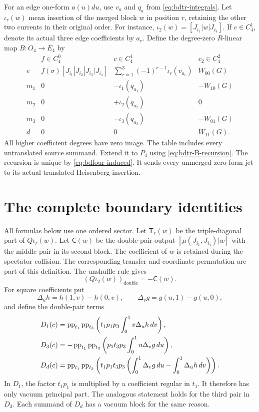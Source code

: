 For an edge one-form $a(u)du$, use $v_a$ and $q_a$ from \eqref{eq:bdtr-integrals}.
Let $\iota_r(w)$ mean insertion of the merged block $w$ in position $r$, retaining the other two currents in their original order.
For instance, $\iota_2(w)=[J_{i_1}|w|J_{i_4}]$.
If $c\in C_4^1$, denote its actual three edge coefficients by $a_r$.
Define the degree-zero $R$-linear map $B:O_4\to E_4$ by
\begin{equation}\label{eq:bdfour-B}
 \begin{array}{c|ccc}
 &f\in C_4^0&c\in C_4^1&c_2\in C_4^2\\ \hline
 e&f(\sigma)[J_{i_1}|J_{i_2}|J_{i_3}|J_{i_4}]
       &\sum_{r=1}^3(-1)^{r-1}\iota_r(v_{a_r})&W_{00}(G)\\
 m_1&0&-\iota_1(q_{a_1})&-W_{10}(G)\\
 m_2&0&+\iota_2(q_{a_2})&0\\
 m_3&0&-\iota_3(q_{a_3})&-W_{01}(G)\\
 d&0&0&W_{11}(G).
 \end{array}
\end{equation}
All higher coefficient degrees have zero image.
The table includes every untranslated source summand.
Extend it to $P_4$ using \eqref{eq:bdtr-B-recursion}.
The recursion is unique by \eqref{eq:bdfour-induced}.
It sends every unmerged zero-form jet to its actual translated Heisenberg insertion.

\section{The complete boundary identities}

All formulas below use one ordered sector.
Let $\mathsf T_r(w)$ be the triple-diagonal part of $Q\iota_r(w)$.
Let $\mathsf C(w)$ be the double-pair output $[\mu(J_{i_1},J_{i_4})|w]$ with the middle pair in its second block.
The coefficient of $w$ is retained during the spectator collision.
The corresponding transfer and coordinate permutation are part of this definition.
The unshuffle rule gives
\[
 (Q\iota_2(w))_{\mathrm{double}}=-\mathsf C(w).
\]
For square coefficients put
\[
 \Delta_uh=h(1,v)-h(0,v),\qquad
 \Delta_vg=g(u,1)-g(u,0),
\]
and define the double-pair terms
\begin{equation}\label{eq:bdfour-side-defects}
 \begin{aligned}
 D_1(c)&=\operatorname{pp}_{t_1}\operatorname{pp}_{t_3}
      \left(t_1p_1p_3\int_0^1v\Delta_uh\,dv\right),\\
 D_3(c)&=-\operatorname{pp}_{t_1}\operatorname{pp}_{t_3}
      \left(p_1t_3p_3\int_0^1u\Delta_vg\,du\right),\\
 D_d(c)&=\operatorname{pp}_{t_1}\operatorname{pp}_{t_3}
      \left(t_1p_1t_3p_3
        \left(\int_0^1\Delta_vg\,du-\int_0^1\Delta_uh\,dv\right)\right).
 \end{aligned}
\end{equation}
In $D_1$, the factor $t_1p_1$ is multiplied by a coefficient regular in $t_1$.
It therefore has only vacuum principal part.
The analogous statement holds for the third pair in $D_3$.
Each summand of $D_d$ has a vacuum block for the same reason.

